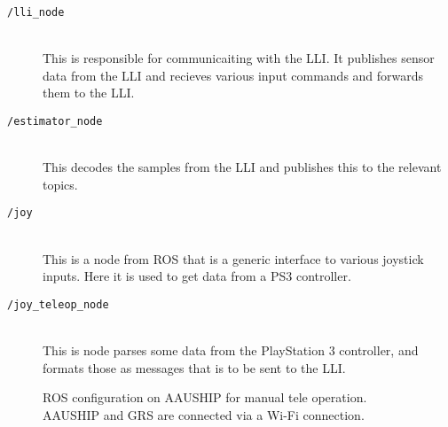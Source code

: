 \begin{description}
	\item[\texttt{/lli\_node}]\hfill \\
		This is responsible for communicaiting with the \ac{LLI}. It
		publishes sensor data from the \ac{LLI} and recieves various input
		commands and forwards them to the \ac{LLI}.
	\item[\texttt{/estimator\_node}]\hfill \\
		This decodes the samples from the \ac{LLI} and publishes this to
		the relevant topics.
	\item[\texttt{/joy}]\hfill \\
		This is a node from \ac{ROS} that is a generic interface to
		various joystick inputs. Here it is used to get data from a PS3
		controller.
	\item[\texttt{/joy\_teleop\_node}]\hfill \\
		This is node parses some data from the PlayStation 3 controller, and formats
		those as messages that is to be sent to the \ac{LLI}.
\end{description}
\begin{figure}[htbp]
	\centering
	
	\caption{ROS configuration on AAUSHIP for manual tele operation.
	AAUSHIP and GRS are connected via a Wi-Fi connection.}
	\label{fig:ros-aauship-teleop}
\end{figure}

